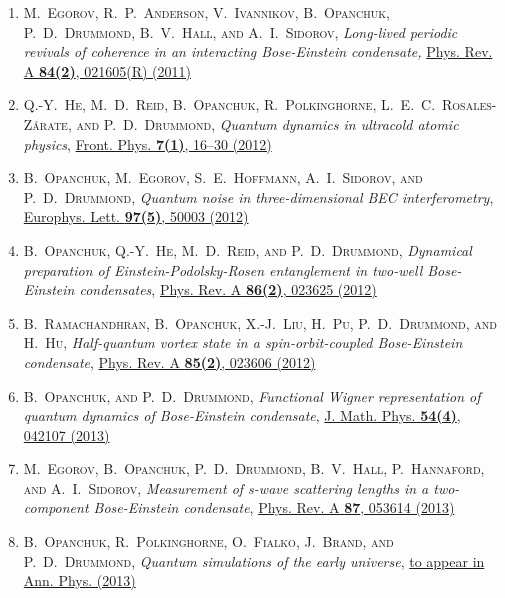 
\begin{enumerate}
\item \textsc{M.~Egorov, R.~P.~Anderson, V.~Ivannikov, B.~Opanchuk, P.~D.~Drummond, B.~V.~Hall, \textnormal{and} A.~I.~Sidorov}, \textit{Long-lived periodic revivals of coherence in an interacting Bose-Einstein condensate,} \href{http://dx.doi.org/doi:10.1103/PhysRevA.84.021605}{Phys. Rev. A \textbf{84(2)}, 021605(R) (2011)}

\item \textsc{Q.-Y.~He, M.~D.~Reid, B.~Opanchuk, R.~Polkinghorne, L.~E.~C.~Rosales-Z\'arate, \textnormal{and} P.~D.~Drummond}, \textit{Quantum dynamics in ultracold atomic physics}, \href{http://dx.doi.org/doi:10.1007/s11467-011-0232-x}{Front. Phys. \textbf{7(1)}, 16--30 (2012)}

\item \textsc{B.~Opanchuk, M.~Egorov, S.~E.~Hoffmann, A.~I.~Sidorov, \textnormal{and} P.~D.~Drummond}, \textit{Quantum noise in three-dimensional BEC interferometry}, \href{http://dx.doi.org/doi:10.1209/0295-5075/97/50003}{Europhys. Lett. \textbf{97(5)}, 50003 (2012)}

\item \textsc{B.~Opanchuk, Q.-Y.~He, M.~D.~Reid, \textnormal{and} P.~D.~Drummond}, \textit{Dynamical preparation of Einstein-Podolsky-Rosen entanglement in two-well Bose-Einstein condensates}, \href{http://dx.doi.org/doi:10.1103/PhysRevA.86.023625}{Phys. Rev. A \textbf{86(2)}, 023625 (2012)}

\item \textsc{B.~Ramachandhran, B.~Opanchuk, X.-J.~Liu, H.~Pu, P.~D.~Drummond, \textnormal{and} H.~Hu}, \textit{Half-quantum vortex state in a spin-orbit-coupled Bose-Einstein condensate}, \href{http://dx.doi.org/doi:10.1103/PhysRevA.85.023606}{Phys. Rev. A \textbf{85(2)}, 023606 (2012)}

\item \textsc{B.~Opanchuk, \textnormal{and} P.~D.~Drummond}, \textit{Functional Wigner representation of quantum dynamics of Bose-Einstein condensate}, \href{http://dx.doi.org/doi:10.1063/1.4801781}{J. Math. Phys. \textbf{54(4)}, 042107 (2013)}

\item \textsc{M.~Egorov, B.~Opanchuk, P.~D.~Drummond, B.~V.~Hall, P.~Hannaford, \textnormal{and} A.~I.~Sidorov}, \textit{Measurement of s-wave scattering lengths in a two-component Bose-Einstein condensate}, \href{http://dx.doi.org/doi:10.1103/PhysRevA.87.053614}{Phys. Rev. A \textbf{87}, 053614 (2013)}

\item \textsc{B.~Opanchuk, R.~Polkinghorne, O.~Fialko, J.~Brand, \textnormal{and} P.~D.~Drummond}, \textit{Quantum simulations of the early universe}, \href{http://dx.doi.org/doi:10.1002/andp.201300113}{to appear in Ann. Phys. (2013)}
\end{enumerate}

